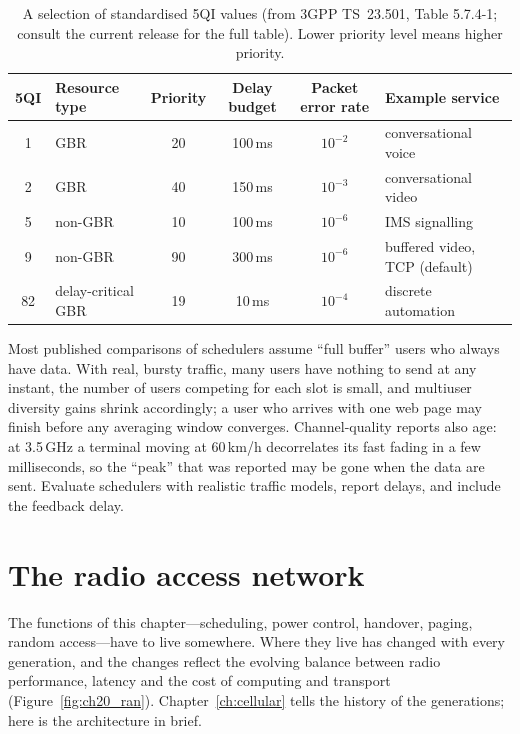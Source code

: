 \begin{table}[htbp]\centering\small
\caption{A selection of standardised 5QI values (from 3GPP TS~23.501, Table 5.7.4-1; consult the current release for the
full table). Lower priority level means higher priority.}
\label{tab:ch20:5qi}
\begin{tabular}{@{}c l c c c l@{}}
\toprule
5QI & Resource type & Priority & Delay budget & Packet error rate & Example service\\
\midrule
1 & GBR & 20 & 100\,ms & $10^{-2}$ & conversational voice\\
2 & GBR & 40 & 150\,ms & $10^{-3}$ & conversational video\\
5 & non-GBR & 10 & 100\,ms & $10^{-6}$ & IMS signalling\\
9 & non-GBR & 90 & 300\,ms & $10^{-6}$ & buffered video, TCP (default)\\
82 & delay-critical GBR & 19 & 10\,ms & $10^{-4}$ & discrete automation\\
\bottomrule
\end{tabular}
\end{table}

\begin{pitfall}
Most published comparisons of schedulers assume ``full buffer'' users who always have data. With real, bursty traffic,
many users have nothing to send at any instant, the number of users competing for each slot is small, and multiuser
diversity gains shrink accordingly; a user who arrives with one web page may finish before any averaging window
converges. Channel-quality reports also age: at 3.5\,GHz a terminal moving at 60\,km/h decorrelates its fast fading in a
few milliseconds, so the ``peak'' that was reported may be gone when the data are sent. Evaluate schedulers with
realistic traffic models, report delays, and include the feedback delay.
\end{pitfall}

\section{The radio access network}
\label{sec:ch20:ran}

The functions of this chapter---scheduling, power control, handover, paging, random access---have to live somewhere.
Where they live has changed with every generation, and the changes reflect the evolving balance between radio
performance, latency and the cost of computing and transport (Figure~\ref{fig:ch20_ran}). Chapter~\ref{ch:cellular}
tells the history of the generations; here is the architecture in brief.

